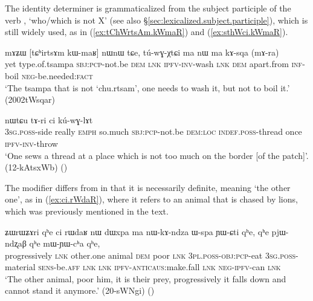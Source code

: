 The identity determiner  is grammaticalized from the subject participle of the verb ,  `who/which is not X' (see also §\ref{sec:lexicalized.subject.participle}), which is still widely used, as in (\ref{ex:tChWrtsAm.kWmaR}) and (\ref{ex:sthWci.kWmaR}).



\begin{exe}
\ex \label{ex:tChWrtsAm.kWmaR}
\gll mɤʑɯ [tɕʰirtsɤm kɯ-maʁ] nɯnɯ tɕe, tú-wɣ-χtɕi ma nɯ ma kɤ-sqa (mɤ-ra) \\
yet type.of.tsampa \textsc{sbj}:\textsc{pcp}-not.be \textsc{dem} \textsc{lnk} \textsc{ipfv}-\textsc{inv}-wash \textsc{lnk} \textsc{dem} apart.from \textsc{inf}-boil \textsc{neg}-be.needed:\textsc{fact} \\
\glt `The tsampa that is not `chu.rtsam', one needs to wash it, but not to boil it.' (2002tWsqar)
\end{exe}

\begin{exe}
\ex \label{ex:sthWci.kWmaR}
 nɯtɕu tɤ-ri ci kú-wɣ-lɤt \\
\textsc{3sg}.\textsc{poss}-side really \textsc{emph} so.much \textsc{sbj}:\textsc{pcp}-not.be \textsc{dem}:\textsc{loc} \textsc{indef}.\textsc{poss}-thread once \textsc{ipfv}-\textsc{inv}-throw \\
\glt `One sews a thread at a place which is not too much on the border [of the patch]'. (12-kAtsxWb)
()
\end{exe}

The modifier  differs from  in that it is necessarily definite, meaning `the other one', as in (\ref{ex:ci.rWdaR}), where it refers to an animal that is chased by lions, which was previously mentioned in the text.

\begin{exe}
\ex \label{ex:ci.rWdaR}
\gll ʑɯrɯʑɤri qʰe ci rɯdaʁ nɯ dɯxpa ma nɯ-kɤ-ndza ɯ-spa ɲɯ-ɕti qʰe, qʰe pjɯ-ndʐaβ qʰe mɯ-ɲɯ-cʰa qʰe, \\
progressively \textsc{lnk} other.one animal \textsc{dem} poor \textsc{lnk} \textsc{3pl}.\textsc{poss}-\textsc{obj}:\textsc{pcp}-eat \textsc{3sg}.\textsc{poss}-material \textsc{sens}-be.\textsc{aff} \textsc{lnk} \textsc{lnk} \textsc{ipfv}-\textsc{anticaus}:make.fall \textsc{lnk} \textsc{neg}-\textsc{ipfv}-can \textsc{lnk} \\
\glt `The other animal, poor him, it is their prey, progressively it falls down and cannot stand it anymore.' (20-sWNgi)
()
\end{exe}

